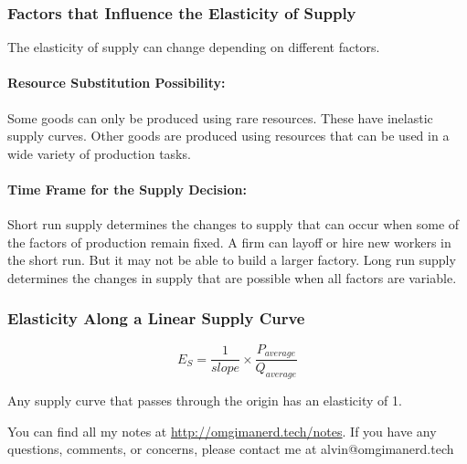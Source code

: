 \documentclass[letterpaper, 12pt]{article}
\begin{document}
\subsubsection{Factors that Influence the Elasticity of Supply}
The elasticity of supply can change depending on different factors.

\paragraph{Resource Substitution Possibility:}
Some goods can only be produced using rare resources. These have inelastic
supply curves. Other goods are produced using resources that can be used in
a wide variety of production tasks.

\paragraph{Time Frame for the Supply Decision:}
Short run supply determines the changes to supply that can occur when some of
the factors of production remain fixed. A firm can layoff or hire new workers
in the short run. But it may not be able to build a larger factory. Long run
supply determines the changes in supply that are possible when all factors are
variable.

\subsubsection{Elasticity Along a Linear Supply Curve}
\[ E_{S} = \frac{1}{slope}\times\frac{P_{average}}{Q_{average}} \]
\begin{center}
\end{center}
Any supply curve that passes through the origin has an elasticity of 1.

\begin{center}
  You can find all my notes at \url{http://omgimanerd.tech/notes}. If you have
  any questions, comments, or concerns, please contact me at
  alvin@omgimanerd.tech
\end{center}
\end{document}
